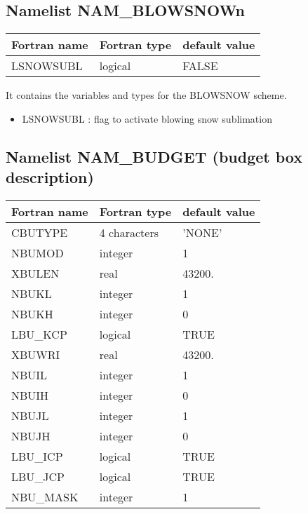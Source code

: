 \subsection{Namelist NAM\_BLOWSNOWn }
\begin{center}
\begin{tabular} {|l|l|l|}
\hline
Fortran name & Fortran type & default value \\
\hline

LSNOWSUBL  & logical & FALSE     \\
\hline
\end{tabular}
\end{center}
It contains the variables and types for the BLOWSNOW scheme.

\begin{itemize}
\item  LSNOWSUBL : flag to activate blowing snow sublimation
\end{itemize}



\subsection{Namelist NAM\_BUDGET (budget box description)}
\label{ss:budget}

\begin{center}
\begin{tabular} {|l|l|l|}
\hline
Fortran name & Fortran type & default value \\
\hline
CBUTYPE   &  4 characters   & 'NONE'     \\
NBUMOD    & integer & 1        \\
XBULEN    & real    & 43200.   \\
NBUKL     & integer & 1        \\
NBUKH     & integer & 0        \\
LBU\_KCP  & logical & TRUE     \\
XBUWRI    & real    & 43200.   \\
NBUIL     & integer & 1        \\
NBUIH     & integer & 0        \\
NBUJL     & integer & 1        \\
NBUJH     & integer & 0        \\
LBU\_ICP  & logical & TRUE     \\
LBU\_JCP  & logical & TRUE     \\
NBU\_MASK & integer & 1 \\
\hline
\end{tabular}
\end{center}

